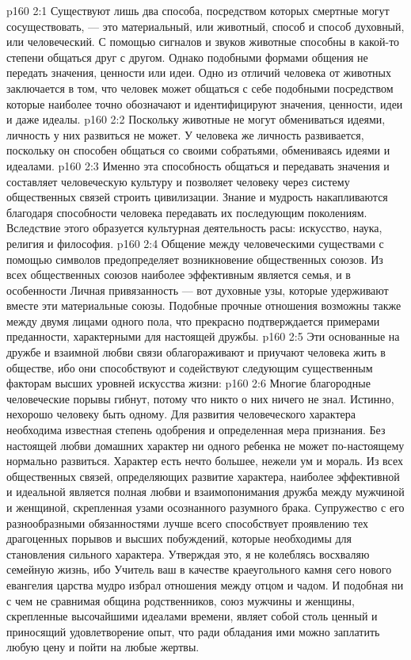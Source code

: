 \vs p160 2:1 Существуют лишь два способа, посредством которых смертные могут сосуществовать, --- это материальный, или животный, способ и способ духовный, или человеческий. С помощью сигналов и звуков животные способны в какой\hyp{}то степени общаться друг с другом. Однако подобными формами общения не передать значения, ценности или идеи. Одно из отличий человека от животных заключается в том, что человек может общаться с себе подобными посредством  которые наиболее точно обозначают и идентифицируют значения, ценности, идеи и даже идеалы.
\vs p160 2:2 Поскольку животные не могут обмениваться идеями, личность у них развиться не может. У человека же личность развивается, поскольку он способен общаться со своими собратьями, обмениваясь идеями и идеалами.
\vs p160 2:3 Именно эта способность общаться и передавать значения и составляет человеческую культуру и позволяет человеку через систему общественных связей строить цивилизации. Знание и мудрость накапливаются благодаря способности человека передавать их последующим поколениям. Вследствие этого образуется культурная деятельность расы: искусство, наука, религия и философия.
\vs p160 2:4 Общение между человеческими существами с помощью символов предопределяет возникновение общественных союзов. Из всех общественных союзов наиболее эффективным является семья, и в особенности  Личная привязанность --- вот духовные узы, которые удерживают вместе эти материальные союзы. Подобные прочные отношения возможны также между двумя лицами одного пола, что прекрасно подтверждается примерами преданности, характерными для настоящей дружбы.
\vs p160 2:5 Эти основанные на дружбе и взаимной любви связи облагораживают и приучают человека жить в обществе, ибо они способствуют и содействуют следующим существенным факторам высших уровней искусства жизни:
\vs p160 2:6 \bibnobreakspace {} Многие благородные человеческие порывы гибнут, потому что никто о них ничего не знал. Истинно, нехорошо человеку быть одному. Для развития человеческого характера необходима известная степень одобрения и определенная мера признания. Без настоящей любви домашних характер ни одного ребенка не может по\hyp{}настоящему нормально развиться. Характер есть нечто большее, нежели ум и мораль. Из всех общественных связей, определяющих развитие характера, наиболее эффективной и идеальной является полная любви и взаимопонимания дружба между мужчиной и женщиной, скрепленная узами осознанного разумного брака. Супружество с его разнообразными обязанностями лучше всего способствует проявлению тех драгоценных порывов и высших побуждений, которые необходимы для становления сильного характера. Утверждая это, я не колеблясь восхваляю семейную жизнь, ибо Учитель ваш в качестве краеугольного камня сего нового евангелия царства мудро избрал отношения между отцом и чадом. И подобная ни с чем не сравнимая община родственников, союз мужчины и женщины, скрепленные высочайшими идеалами времени, являет собой столь ценный и приносящий удовлетворение опыт, что ради обладания ими можно заплатить любую цену и пойти на любые жертвы.
